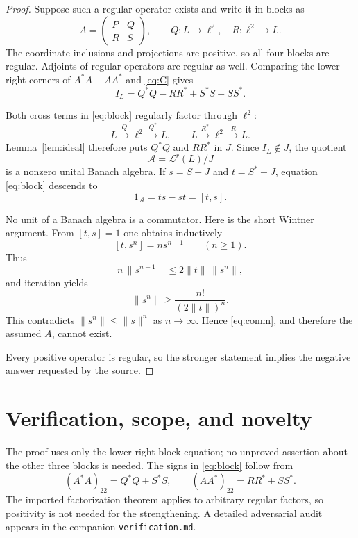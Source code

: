 \documentclass[11pt]{article}
\newcommand{\Lr}{\mathcal L^r}
\newcommand{\ellTwo}{\ell^2}
\begin{document}
\begin{proof}
Suppose such a regular operator exists and write it in blocks as
\[
 A=\begin{pmatrix}P&Q\\R&S\end{pmatrix},
 \qquad
 Q:L\longrightarrow\ellTwo,\quad
 R:\ellTwo\longrightarrow L.
\]
The coordinate inclusions and projections are positive, so all four blocks
are regular.  Adjoints of regular operators are regular as well.  Comparing
the lower-right corners of $A^*A-AA^*$ and \eqref{eq:C} gives
\begin{equation}\label{eq:block}
 I_L=Q^*Q-RR^*+S^*S-SS^*.
\end{equation}

Both cross terms in \eqref{eq:block} regularly factor through $\ellTwo$:
\[
 L\xrightarrow{Q}\ellTwo\xrightarrow{Q^*}L,
 \qquad
 L\xrightarrow{R^*}\ellTwo\xrightarrow{R}L.
\]
Lemma~\ref{lem:ideal} therefore puts $Q^*Q$ and $RR^*$ in $J$.  Since
$I_L\notin J$, the quotient
\[
 \mathcal A=\Lr(L)/J
\]
is a nonzero unital Banach algebra.  If $s=S+J$ and $t=S^*+J$, equation
\eqref{eq:block} descends to
\begin{equation}\label{eq:comm}
 1_{\mathcal A}=ts-st=[t,s].
\end{equation}

No unit of a Banach algebra is a commutator.  Here is the short Wintner
argument.  From $[t,s]=1$ one obtains inductively
\[
 [t,s^n]=n s^{n-1}\qquad(n\geq1).
\]
Thus
\[
 n\,\|s^{n-1}\|\leq 2\|t\|\,\|s^n\|,
\]
and iteration yields
\[
 \|s^n\|\geq \frac{n!}{(2\|t\|)^n}.
\]
This contradicts $\|s^n\|\leq\|s\|^n$ as $n\to\infty$.  Hence
\eqref{eq:comm}, and therefore the assumed $A$, cannot exist.

Every positive operator is regular, so the stronger statement implies the
negative answer requested by the source.
\end{proof}

\section{Verification, scope, and novelty}

The proof uses only the lower-right block equation; no unproved assertion
about the other three blocks is needed.  The signs in \eqref{eq:block}
follow from
\[
 (A^*A)_{22}=Q^*Q+S^*S,
 \qquad
 (AA^*)_{22}=RR^*+SS^*.
\]
The imported factorization theorem applies to arbitrary regular factors, so
positivity is not needed for the strengthening.  A detailed adversarial
audit appears in the companion \texttt{verification.md}.
\end{document}
